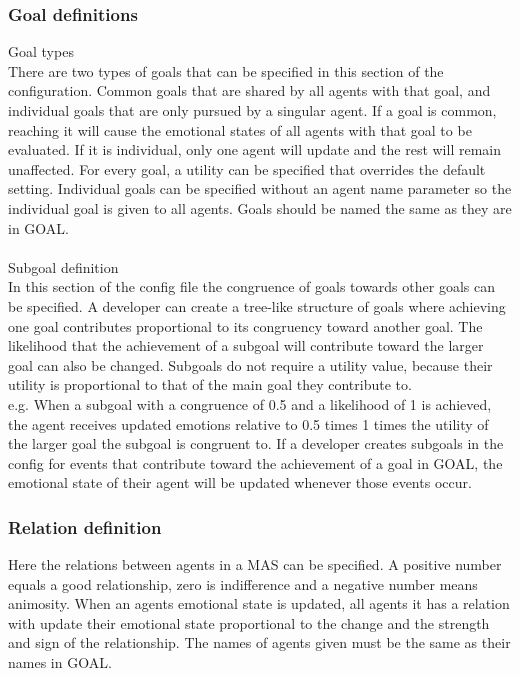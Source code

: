 \documentclass[11pt]{article}
\begin{document}
\subsubsection*{Goal definitions}
Goal types\\
There are two types of goals that can be specified in this section of the configuration. Common goals that are shared by all agents with that goal, and individual goals that are only pursued by a singular agent. If a goal is common, reaching it will cause the emotional states of all agents with that goal to be evaluated. If it is individual, only one agent will update and the rest will remain unaffected. For every goal, a utility can be specified that overrides the default setting. Individual goals can be specified without an agent name parameter so the individual goal is given to all agents. Goals should be named the same as they are in GOAL.\\
\\
Subgoal definition\\
In this section of the config file the congruence of goals towards other goals can be specified. A developer can create a tree-like structure of goals where achieving one goal contributes proportional to its congruency toward another goal. The likelihood that the achievement of a subgoal will contribute toward the larger goal can also be changed. Subgoals do not require a utility value, because their utility is proportional to that of the main goal they contribute to.\\e.g. When a subgoal with a congruence of 0.5 and a likelihood of 1 is achieved, the agent receives updated emotions relative to 0.5 times 1 times the utility of the larger goal the subgoal is congruent to. If a developer creates subgoals in the config for events that contribute toward the achievement of a goal in GOAL, the emotional state of their agent will be updated whenever those events occur.
\subsubsection*{Relation definition}
Here the relations between agents in a MAS can be specified. A positive number equals a good relationship, zero is indifference and a negative number means animosity. When an agents emotional state is updated, all agents it has a relation with update their emotional state proportional to the change and the strength and sign of the relationship. The names of agents given must be the same as their names in GOAL.
\end{document}
